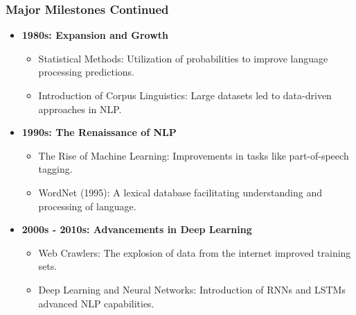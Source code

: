\documentclass{beamer}
\begin{document}
\begin{frame}[fragile]
    \frametitle{Major Milestones Continued}
    \begin{itemize}
        \item \textbf{1980s: Expansion and Growth}
        \begin{itemize}
            \item Statistical Methods: Utilization of probabilities to improve language processing predictions.
            \item Introduction of Corpus Linguistics: Large datasets led to data-driven approaches in NLP.
        \end{itemize}

        \item \textbf{1990s: The Renaissance of NLP}
        \begin{itemize}
            \item The Rise of Machine Learning: Improvements in tasks like part-of-speech tagging.
            \item WordNet (1995): A lexical database facilitating understanding and processing of language.
        \end{itemize}
        
        \item \textbf{2000s - 2010s: Advancements in Deep Learning}
        \begin{itemize}
            \item Web Crawlers: The explosion of data from the internet improved training sets.
            \item Deep Learning and Neural Networks: Introduction of RNNs and LSTMs advanced NLP capabilities.
        \end{itemize}
    \end{itemize}
\end{frame}
\end{document}
